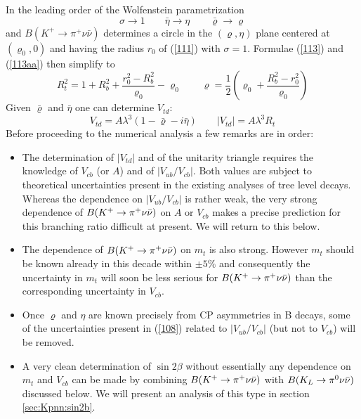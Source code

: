 In the leading order of the Wolfenstein parametrization
%
\begin{equation}\label{113ab}
\sigma \to 1 \qquad \bar\eta \to \eta \qquad \bar\varrho \to \varrho
\end{equation}
%
and $B(K^+ \to \pi^+ \nu \bar\nu)$ determines a circle in the
$(\varrho,\eta)$ plane centered at $(\varrho_0,0)$ and having the radius
$r_0$ of (\ref{111}) with $\sigma =1$. Formulae (\ref{113}) and
(\ref{113aa}) then simplify to \cite{buchallaburas:94}
%
\begin{equation}\label{113a}
R_t^2 = 1 + R_b^2 + \frac{r_0^2 - R_b^2}{\varrho_0} - \varrho_0 \qquad
\varrho = \frac{1}{2} \left( \varrho_0 + \frac{R_b^2 - r_0^2}{\varrho_0}
\right)
\end{equation}
Given $\bar\varrho$ and $\bar\eta$ one can determine $V_{td}$:
\begin{equation}\label{vtdrhoeta}
V_{td}=A \lambda^3(1-\bar\varrho-i\bar\eta)\qquad
|V_{td}|=A \lambda^3 R_t
\end{equation}
Before proceeding to the numerical analysis a few remarks are in
order:
\begin{itemize}
\item
The determination of $|V_{td}|$ and of the unitarity triangle requires
the knowledge of $V_{cb}$ (or $A$) and of $|V_{ub}/V_{cb}|$. Both
values are subject to theoretical uncertainties present in the existing
analyses of tree level decays. Whereas the dependence on
$|V_{ub}/V_{cb}|$ is rather weak, the very strong dependence of
$B(K^+ \to \pi^+\nu\bar\nu)$ on $A$ or $V_{cb}$ makes a precise prediction for this
branching ratio difficult at present. We will return to this below.
\item
The dependence of $B(K^+ \to \pi^+\nu\bar\nu)$ on $m_t$ is also strong. However $m_t$
should be known already in this decade within $\pm 5\%$ and
consequently the uncertainty in $m_t$ will soon be less serious for
$B(K^+ \to \pi^+\nu\bar\nu)$ than the corresponding uncertainty in $V_{cb}$.
\item
Once $\varrho$ and $\eta$ are known precisely from CP asymmetries in
B decays, some of the uncertainties present in (\ref{108}) related
to $|V_{ub}/V_{cb}|$ (but not to $V_{cb}$) will be removed.
\item
A very clean determination of $\sin 2\beta$ without essentially
any dependence on $m_t$ and $V_{cb}$ can be made by combining
$B(K^+ \to \pi^+\nu\bar\nu)$ with $B(K_L \to \pi^0\nu\bar\nu)$ discussed below. We will present an
analysis of this type in section \ref{sec:Kpnn:sin2b}.
\end{itemize}

